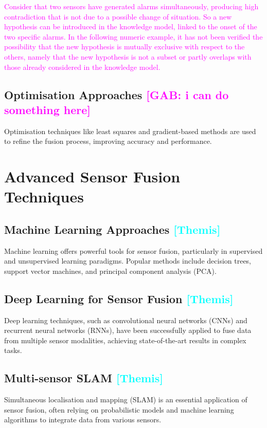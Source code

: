 \documentclass[journal]{IEEEtran}
\newcommand{\GO}[1]{\textcolor{magenta}{{#1}}}
\newcommand{\TC}[1]{\textcolor{cyan}{{#1}}}
\begin{document}
\GO{Consider that two sensors have generated alarms simultaneously, producing high contradiction that is not due to a possible change of situation. So a new hypothesis can be introduced in the knowledge model, linked to the onset of the two specific alarms. In the following numeric example, it has not been verified the possibility that the new hypothesis is mutually exclusive with respect to the others, namely that the new hypothesis is not a subset or partly overlaps with those already considered in the knowledge model.}

\subsection{Optimisation Approaches \GO{[GAB: i can do something here]}}
Optimisation techniques like least squares and gradient-based methods are used to refine the fusion process, improving accuracy and performance.

\section{Advanced Sensor Fusion Techniques}

\subsection{Machine Learning Approaches \TC{[Themis]}}
Machine learning offers powerful tools for sensor fusion, particularly in supervised and unsupervised learning paradigms. Popular methods include decision trees, support vector machines, and principal component analysis (PCA).

\subsection{Deep Learning for Sensor Fusion \TC{[Themis]}}
Deep learning techniques, such as convolutional neural networks (CNNs) and recurrent neural networks (RNNs), have been successfully applied to fuse data from multiple sensor modalities, achieving state-of-the-art results in complex tasks.

\subsection{Multi-sensor SLAM \TC{[Themis]}}
Simultaneous localisation and mapping (SLAM) is an essential application of sensor fusion, often relying on probabilistic models and machine learning algorithms to integrate data from various sensors.
\end{document}
